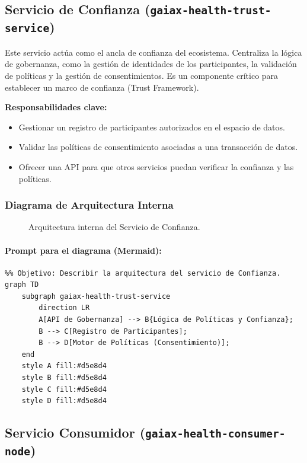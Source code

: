 \subsection{Servicio de Confianza (\texttt{gaiax-health-trust-service})}

Este servicio actúa como el ancla de confianza del ecosistema. Centraliza la lógica de gobernanza, como la gestión de identidades de los participantes, la validación de políticas y la gestión de consentimientos. Es un componente crítico para establecer un marco de confianza (Trust Framework).

\textbf{Responsabilidades clave:}
\begin{itemize}
    \item Gestionar un registro de participantes autorizados en el espacio de datos.
    \item Validar las políticas de consentimiento asociadas a una transacción de datos.
    \item Ofrecer una API para que otros servicios puedan verificar la confianza y las políticas.
\end{itemize}

\subsubsection*{Diagrama de Arquitectura Interna}
\begin{figure}[H]
    \centering
    \caption{Arquitectura interna del Servicio de Confianza.}
    \label{fig:trust_arch}
\end{figure}

\paragraph{Prompt para el diagrama (Mermaid):}
\begin{verbatim}
%% Objetivo: Describir la arquitectura del servicio de Confianza.
graph TD
    subgraph gaiax-health-trust-service
        direction LR
        A[API de Gobernanza] --> B{Lógica de Políticas y Confianza};
        B --> C[Registro de Participantes];
        B --> D[Motor de Políticas (Consentimiento)];
    end
    style A fill:#d5e8d4
    style B fill:#d5e8d4
    style C fill:#d5e8d4
    style D fill:#d5e8d4
\end{verbatim}

\subsection{Servicio Consumidor (\texttt{gaiax-health-consumer-node})}

